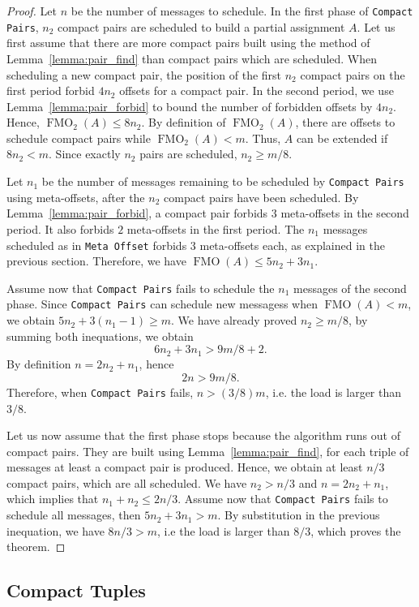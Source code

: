\documentclass[a4paper,UKenglish,cleveref, autoref, thm-restate]{lipics-v2019}
\DeclareMathOperator{\Fmo}{FMO}
\newcommand\compactpair{\texttt{Compact Pairs}\xspace}
\newcommand\metaoffset{\texttt{Meta Offset}\xspace}
\begin{document}
\begin{proof}
Let $n$ be the number of messages to schedule.
In the first phase of \compactpair, $n_2$ compact pairs are scheduled to build a partial assignment $A$. Let us first assume that there are more compact pairs built 
using the method of Lemma~\ref{lemma:pair_find} than compact pairs which are scheduled.
When scheduling a new compact pair, the position of the first $n_2$ compact pairs on the first period forbid $4n_2$ offsets for a compact pair. In the second period, we use Lemma~\ref{lemma:pair_forbid} to bound the number of forbidden offsets by $4n_2$.   
Hence, $\Fmo_2(A) \leq 8n_2$. By definition of $\Fmo_2(A)$, there are offsets to schedule compact pairs while $\Fmo_2(A) < m$. Thus, $A$ can be extended if $8n_2 < m$.
Since exactly $n_2$ pairs are scheduled, $n_2 \geq m/8$.  

Let $n_1$ be the number of messages remaining to be scheduled by \compactpair using meta-offsets, after the $n_2$ compact pairs have been scheduled. By Lemma~\ref{lemma:pair_forbid}, a compact pair forbids $3$ meta-offsets in the second period. It also forbids $2$ meta-offsets in the first period. The $n_1$ messages scheduled as in \metaoffset forbids $3$ meta-offsets each, as explained in the previous section.
Therefore, we have $\Fmo(A) \leq 5n_2 + 3n_1$. 

Assume now that \compactpair fails to schedule the $n_1$ messages of the second phase.
Since \compactpair can schedule new messagess when $\Fmo(A) < m$, 
we obtain $5n_2 + 3(n_1-1) \geq m$. We have already proved $n_2 \geq  m/8$, by summing both inequations, we obtain $$6n_2 + 3n_1 > 9m/8 + 2.$$ By definition $n = 2n_2 + n_1$, hence $$2n > 9m/8.$$ Therefore, when \compactpair fails, $n > (3/8)m$, i.e. the load is larger than $3/8$.

Let us now assume that the first phase stops because the algorithm runs out of compact pairs. They are built using Lemma~\ref{lemma:pair_find}, for each triple of messages at least a compact pair is produced. Hence, we obtain at least $n/3$ compact pairs, which are all scheduled. We have $n_2 > n/3$ and $n= 2n_2 + n_1$, which implies that $n_1 + n_2 \leq 2n/3$.
Assume now that \compactpair fails to schedule all messages, then $5n_2 + 3n_1 > m$.
By substitution in the previous inequation, we have $ 8n/3  > m$, i.e the load is larger than $8/3$, which proves the theorem.
\end{proof}



\subsection{Compact Tuples}\label{sec:compact}
\end{document}
